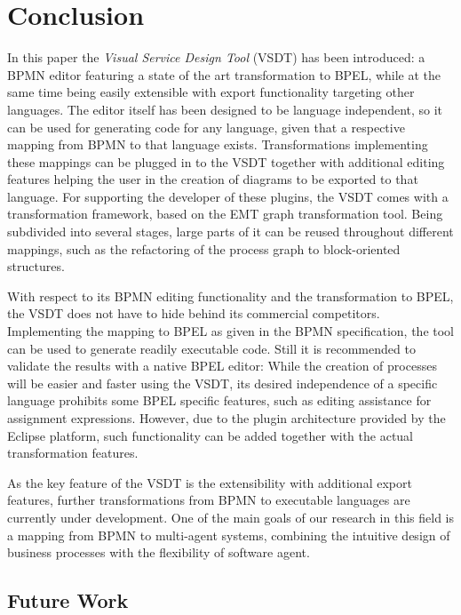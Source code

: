 \section{Conclusion}
\label{sec:conclusion}

In this paper the \emph{Visual Service Design Tool} (VSDT) has been introduced: a BPMN editor featuring a state of the art transformation to BPEL, while at the same time being easily extensible with export functionality targeting other languages.  The editor itself has been designed to be language independent, so it can be used for generating code for any language, given that a respective mapping from BPMN to that language exists.
Transformations implementing these mappings can be plugged in to the VSDT together with additional editing features helping the user in the creation of diagrams to be exported to that language.  For supporting the developer of these plugins, the VSDT comes with a transformation framework, based on the EMT graph transformation tool.  Being subdivided into several stages, large parts of it can be reused throughout different mappings, such as the refactoring of the process graph to block-oriented structures.

With respect to its BPMN editing functionality and the transformation to BPEL, the VSDT does not have to hide behind its commercial competitors.  Implementing the mapping to BPEL as given in the BPMN specification, the tool can be used to generate readily executable code.  Still it is recommended to validate the results with a native BPEL editor:  While the creation of processes will be easier and faster using the VSDT, its desired independence of a specific language prohibits some BPEL specific features, such as editing assistance for assignment expressions.  However, due to the plugin architecture provided by the Eclipse platform, such functionality can be added together with the actual transformation features.

As the key feature of the VSDT is the extensibility with additional export features, further transformations from BPMN to executable languages are currently under development.  One of the main goals of our research in this field is a mapping from BPMN to multi-agent systems, combining the intuitive design of business processes with the flexibility of software agent.


\subsection{Future Work}
\label{sec:conc_future}

